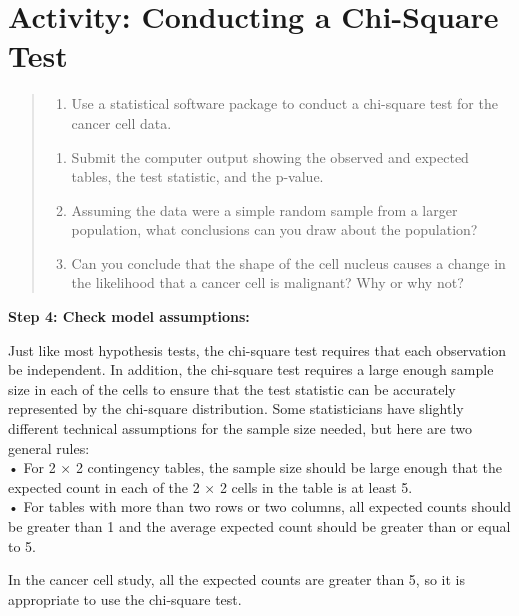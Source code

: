 \documentclass[
]{report}
\providecommand{\tightlist}{%
  \setlength{\itemsep}{0pt}\setlength{\parskip}{0pt}}
\begin{document}
\hypertarget{activity-conducting-a-chi-square-test}{%
\section*{Activity: Conducting a Chi-Square Test}\label{activity-conducting-a-chi-square-test}}

\begin{quote}
\begin{enumerate}
\def\labelenumi{\arabic{enumi}.}
\setcounter{enumi}{18}
\tightlist
\item
  Use a statistical software package to conduct a chi-square test for the cancer cell data.
\end{enumerate}

\begin{enumerate}
\def\labelenumi{\alph{enumi}.}
\tightlist
\item
  Submit the computer output showing the observed and expected tables, the test statistic, and the
  p-value.
\item
  Assuming the data were a simple random sample from a larger population, what conclusions can
  you draw about the population?
\item
  Can you conclude that the shape of the cell nucleus causes a change in the likelihood that a cancer
  cell is malignant? Why or why not?
\end{enumerate}
\end{quote}

\textbf{Step 4: Check model assumptions:}

Just like most hypothesis tests, the chi-square test requires that each observation be independent. In addition, the chi-square test requires a large enough sample size in each of the cells to ensure that the test statistic can be accurately represented by the chi-square distribution. Some statisticians have slightly different technical assumptions for the sample size needed, but here are two general rules:\\
• For 2 × 2 contingency tables, the sample size should be large enough that the expected count in each of the 2 × 2 cells in the table is at least 5.\\
• For tables with more than two rows or two columns, all expected counts should be greater than 1 and the average expected count should be greater than or equal to 5.

In the cancer cell study, all the expected counts are greater than 5, so it is appropriate to use the chi-square test.
\end{document}
